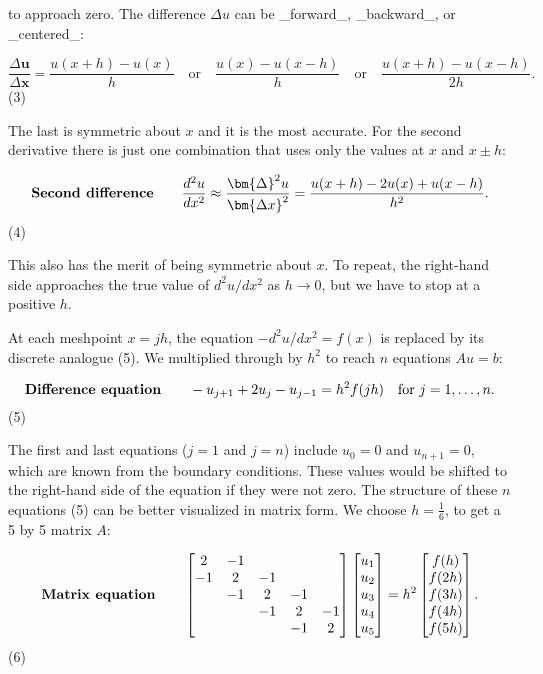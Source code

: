 to approach zero. The difference \(\Delta u\) can be _forward_, _backward_, or _centered_:

\[\frac{\Delta\bm{u}}{\Delta\bm{x}}=\frac{u(x+h)-u(x)}{h}\quad\text{or}\quad\frac{ u(x)-u(x-h)}{h}\quad\text{or}\quad\frac{u(x+h)-u(x-h)}{2h}.\] (3)

The last is symmetric about \(x\) and it is the most accurate. For the second derivative there is just one combination that uses only the values at \(x\) and \(x\pm h\):

\[\text{\bf Second difference}\qquad\frac{d^{2}u}{dx^{2}}\approx\frac{\bm{ \Delta}^{2}u}{\bm{\Delta x}^{2}}=\frac{u(x+h)-2u(x)+u(x-h)}{h^{2}}.\] (4)

This also has the merit of being symmetric about \(x\). To repeat, the right-hand side approaches the true value of \(d^{2}u/dx^{2}\) as \(h\to 0\), but we have to stop at a positive \(h\).

At each meshpoint \(x=jh\), the equation \(-d^{2}u/dx^{2}=f(x)\) is replaced by its discrete analogue (5). We multiplied through by \(h^{2}\) to reach \(n\) equations \(Au=b\):

\[\text{\bf Difference equation}\qquad-u_{j+1}+2u_{j}-u_{j-1}=h^{2}f(jh)\quad \text{for }j=1,\ldots,n.\] (5)

The first and last equations (\(j=1\) and \(j=n\)) include \(u_{0}=0\) and \(u_{n+1}=0\), which are known from the boundary conditions. These values would be shifted to the right-hand side of the equation if they were not zero. The structure of these \(n\) equations (5) can be better visualized in matrix form. We choose \(h=\frac{1}{6}\), to get a 5 by 5 matrix \(A\):

\[\text{\bf Matrix equation}\qquad\begin{bmatrix}2&-1&&&\\ -1&2&-1&&\\ &-1&2&-1&\\ &&-1&2&-1\\ &&&-1&2\\ \end{bmatrix}\begin{bmatrix}u_{1}\\ u_{2}\\ u_{3}\\ u_{4}\\ u_{5}\end{bmatrix}=h^{2}\begin{bmatrix}f(h)\\ f(2h)\\ f(3h)\\ f(4h)\\ f(5h)\end{bmatrix}.\] (6)

